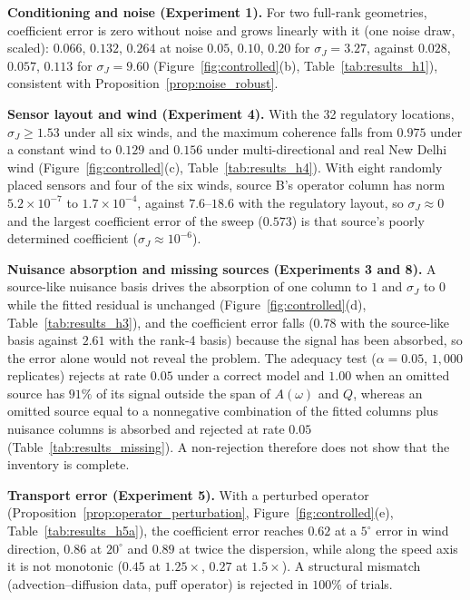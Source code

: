 \noindent\textbf{Conditioning and noise (Experiment 1).}
For two full-rank geometries, coefficient error is zero without noise and grows
linearly with it (one noise draw, scaled): \(0.066\), \(0.132\), \(0.264\) at noise
\(0.05\), \(0.10\), \(0.20\) for \(\sigma_J=3.27\), against \(0.028\), \(0.057\), \(0.113\)
for \(\sigma_J=9.60\) (Figure~\ref{fig:controlled}(b), Table~\ref{tab:results_h1}),
consistent with Proposition~\ref{prop:noise_robust}.

\noindent\textbf{Sensor layout and wind (Experiment 4).}
With the 32 regulatory locations, \(\sigma_J\ge1.53\) under all six winds, and the
maximum coherence falls from \(0.975\) under a constant wind to \(0.129\) and \(0.156\)
under multi-directional and real New Delhi wind (Figure~\ref{fig:controlled}(c),
Table~\ref{tab:results_h4}).  With eight randomly placed sensors and four of the six
winds, source B's operator column has norm \(5.2\times10^{-7}\) to \(1.7\times10^{-4}\),
against \(7.6\)--\(18.6\) with the regulatory layout, so \(\sigma_J\approx0\) and the
largest coefficient error of the sweep (\(0.573\)) is that source's poorly determined
coefficient (\(\sigma_J\approx10^{-6}\)).

\noindent\textbf{Nuisance absorption and missing sources (Experiments 3 and 8).}
A source-like nuisance basis drives the absorption of one column to \(1\) and
\(\sigma_J\) to \(0\) while the fitted residual is unchanged (Figure~\ref{fig:controlled}(d),
Table~\ref{tab:results_h3}), and the coefficient error falls (\(0.78\) with the
source-like basis against \(2.61\) with the rank-4 basis) because the signal has been
absorbed, so the error alone would not reveal the problem.
The adequacy test (\(\alpha=0.05\), \(1{,}000\) replicates) rejects at rate \(0.05\) under
a correct model and \(1.00\) when an omitted source has \(91\%\) of its signal outside the
span of \(A(\omega)\) and \(Q\), whereas an omitted source equal to a nonnegative
combination of the fitted columns plus nuisance columns is absorbed and rejected at rate
\(0.05\)
(Table~\ref{tab:results_missing}).  A non-rejection therefore does not show that the inventory is complete.

\noindent\textbf{Transport error (Experiment 5).}
With a perturbed operator (Proposition~\ref{prop:operator_perturbation},
Figure~\ref{fig:controlled}(e), Table~\ref{tab:results_h5a}), the coefficient error reaches \(0.62\) at a \(5^\circ\) error in wind
direction, \(0.86\) at \(20^\circ\) and \(0.89\) at twice the dispersion, while along the
speed axis it is not monotonic (\(0.45\) at \(1.25\times\), \(0.27\) at
\(1.5\times\)).  A structural mismatch (advection--diffusion data, puff operator) is rejected in
\(100\%\) of trials.


